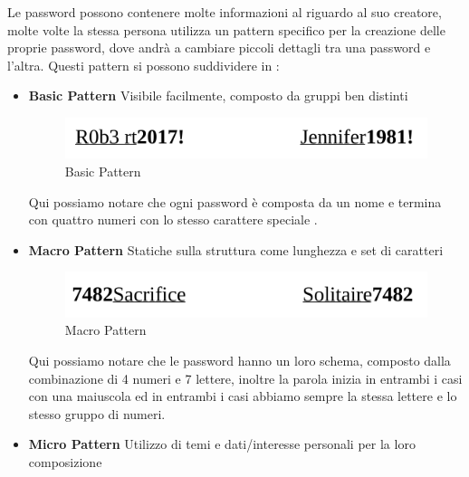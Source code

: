 Le password possono contenere molte informazioni al riguardo al suo creatore, molte volte la stessa persona utilizza un pattern specifico per la creazione delle proprie password, dove andrà a cambiare piccoli dettagli tra una password e l'altra.
Questi pattern si possono suddividere in :
\begin{itemize}
    \item \textbf{Basic Pattern}\newline
          Visibile facilmente, composto da gruppi ben distinti\newline
          \begin{figure}[h]
              \centering
              \includegraphics[width=\linewidth]{Immagini/introduzione/Basic_Pattern.png}
              \caption{Basic Pattern}
              \label{fig:basic}
          \end{figure}
          \newline Qui possiamo notare che ogni password è composta da un nome e termina con quattro numeri con lo stesso carattere speciale \!.
          \newpage
    \item \textbf{Macro Pattern}\newline
          Statiche sulla struttura come lunghezza e set di caratteri\newline
          \begin{figure}[h]
              \centering
              \includegraphics[width=\linewidth]{Immagini/introduzione/Macro_pattern.png}
              \caption{Macro Pattern}
              \label{fig:macro}
          \end{figure}
          \newline Qui possiamo notare che le password hanno un loro schema, composto dalla combinazione di 4 numeri e 7 lettere, inoltre la parola inizia in entrambi i casi con una maiuscola ed in entrambi i casi abbiamo sempre la stessa lettere e lo stesso gruppo di numeri.
    \item \textbf{Micro Pattern}\newline
          Utilizzo di temi e dati/interesse personali per la loro composizione\newline

\end{itemize}
